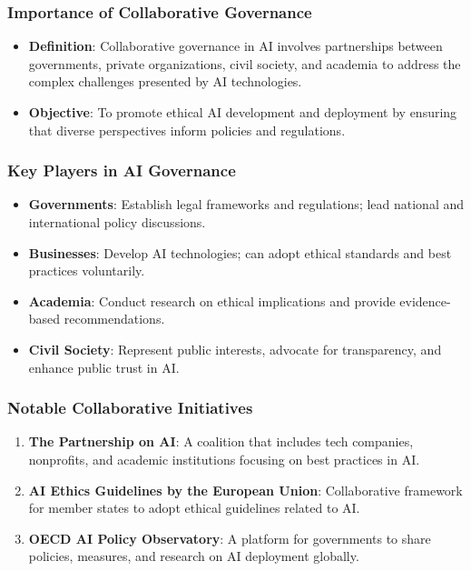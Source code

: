 \documentclass[aspectratio=169]{beamer}
\begin{document}
\begin{frame}[fragile]
    \frametitle{Importance of Collaborative Governance}
    \begin{itemize}
        \item \textbf{Definition}: Collaborative governance in AI involves partnerships between governments, private organizations, civil society, and academia to address the complex challenges presented by AI technologies.
        \item \textbf{Objective}: To promote ethical AI development and deployment by ensuring that diverse perspectives inform policies and regulations.
    \end{itemize}
\end{frame}

\begin{frame}[fragile]
    \frametitle{Key Players in AI Governance}
    \begin{itemize}
        \item \textbf{Governments}: Establish legal frameworks and regulations; lead national and international policy discussions.
        \item \textbf{Businesses}: Develop AI technologies; can adopt ethical standards and best practices voluntarily.
        \item \textbf{Academia}: Conduct research on ethical implications and provide evidence-based recommendations.
        \item \textbf{Civil Society}: Represent public interests, advocate for transparency, and enhance public trust in AI.
    \end{itemize}
\end{frame}

\begin{frame}[fragile]
    \frametitle{Notable Collaborative Initiatives}
    \begin{enumerate}
        \item \textbf{The Partnership on AI}: A coalition that includes tech companies, nonprofits, and academic institutions focusing on best practices in AI.
        \item \textbf{AI Ethics Guidelines by the European Union}: Collaborative framework for member states to adopt ethical guidelines related to AI.
        \item \textbf{OECD AI Policy Observatory}: A platform for governments to share policies, measures, and research on AI deployment globally.
    \end{enumerate}
\end{frame}
\end{document}
